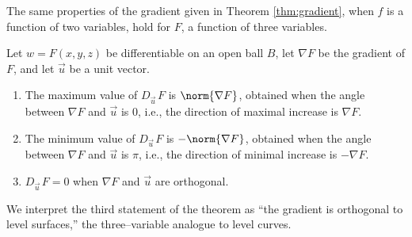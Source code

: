 The same properties of the gradient given in Theorem \ref{thm:gradient}, when $f$ is a function of two variables, hold for $F$, a function of three variables.

\enlargethispage{2\baselineskip}
{Let $w=F(x,y,z)$ be differentiable on an open ball $B$, let $\nabla F$ be the gradient of $F$, and let $\vec u$ be a unit vector.
\begin{enumerate}
	\item The maximum value of $D_{\vec u\,}F$ is $\norm{\nabla F}$, obtained when the angle between $\nabla F$ and $\vec u$ is 0, i.e.,  the direction of maximal increase is $\nabla F$.
	\item The minimum value of $D_{\vec u\,}F$ is $-\norm{\nabla F}$, obtained when the angle between $\nabla F$ and $\vec u$ is $\pi$, i.e., the direction of minimal increase is $-\nabla F$.
	\item $D_{\vec u\,}F = 0$ when $\nabla F$ and $\vec u$ are orthogonal.
\end{enumerate}
}

We interpret the third statement of the theorem as ``the gradient is orthogonal to level surfaces,'' the three--variable analogue to level curves.\\

